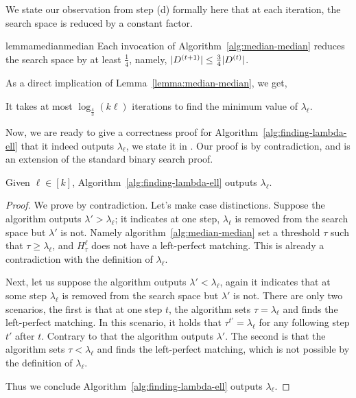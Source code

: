 \documentclass{article}
\begin{document}


We state our observation from step (d) formally here that at each iteration, the search space is reduced by a constant factor. 

\begin{restatable}{lemma}{medianmedian}
    \label{lemma:median-median}
    Each invocation of Algorithm~\ref{alg:median-median} reduces the search space by at least $\frac{1}{4}$, namely, $\lvert D^{(t+1)} \rvert  \leq \frac{3}{4} \lvert D^{(t)} \rvert $.
\end{restatable}



As a direct implication of Lemma~\ref{lemma:median-median}, we get,
\begin{corollary}
    It takes at most $\log_{\frac{4}{3}}(k \ell)$ iterations to find the minimum value of $\lambda_{\ell}$.
\end{corollary}

Now, we are ready to give a correctness proof for Algorithm~\ref{alg:finding-lambda-ell} that it indeed outputs $\lambda_{\ell}$, we state it in . 
Our proof is by contradiction, and is an extension of the standard binary search proof. 

\begin{theorem}
    \label{theorem:correctness-of-finding-lambda-ell}
    Given $\ell \in [k]$, Algorithm~\ref{alg:finding-lambda-ell} outputs $\lambda_{\ell}$. 
\end{theorem}
\begin{proof}
    We prove by contradiction. 
    Let's make case distinctions. 
    Suppose the algorithm outputs $\lambda' > \lambda_{\ell}$; it indicates at one step, $\lambda_{\ell}$ is removed from the search space but $\lambda'$ is not. 
    Namely algorithm~\ref{alg:median-median} set a threshold $\tau$ such that $\tau \geq \lambda_{\ell}$, and $H^{\ell}_{\tau}$ does not have a left-perfect matching. 
    This is already a contradiction with the definition of $\lambda_{\ell}$. 

    Next, let us suppose the algorithm outputs $\lambda' < \lambda_{\ell}$, again it indicates that at some step $\lambda_{\ell}$ is removed from the search space but $\lambda'$ is not. 
    There are only two scenarios, the first is that at one step $t$, the algorithm sets $\tau = \lambda_{\ell}$ and finds the left-perfect matching. In this scenario, it holds that $\tau^{t'} = \lambda_{\ell}$ for any following step $t'$ after $t$. Contrary to that the algorithm outputs $\lambda'$. 
    The second is that the algorithm sets $\tau < \lambda_{\ell}$ and finds the left-perfect matching, which is not possible by the definition of $\lambda_{\ell}$. 

    Thus we conclude Algorithm~\ref{alg:finding-lambda-ell} outputs $\lambda_{\ell}$. 
\end{proof}
\end{document}

